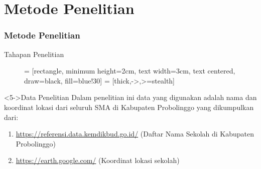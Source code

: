 \section{Metode Penelitian}
\begin{frame}
\frametitle{Metode Penelitian}
\begin{block}{Tahapan Penelitian}
\begin{figure}[H]
\centering
 = [rectangle, minimum height=2cm, text width=3cm, text centered, draw=black, fill=blue!30]
 = [thick,->,>=stealth]
\end{figure}
\end{block}

\begin{block}<5->{Data Penelitian}
Dalam penelitian ini data yang digunakan adalah nama dan koordinat lokasi dari seluruh SMA di Kabupaten Probolinggo yang dikumpulkan dari:

\begin{enumerate}
\item \url{https://referensi.data.kemdikbud.go.id/} (Daftar Nama Sekolah di Kabupaten Probolinggo)
\item \url{https://earth.google.com/} (Koordinat lokasi sekolah)
\end{enumerate}
\end{block}
\end{frame}